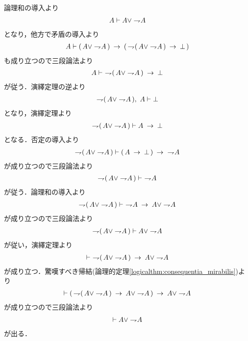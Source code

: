 	\begin{prf}
		論理和の導入より
		\begin{align}
			A \vdash A \vee \negation A
		\end{align}
		となり，他方で矛盾の導入より
		\begin{align}
			A \vdash (\, A \vee \negation A\, )
			\rarrow (\, \negation (\, A \vee \negation A\, ) \rarrow \bot\, )
		\end{align}
		も成り立つので三段論法より
		\begin{align}
			A \vdash\ \negation (\, A \vee \negation A\, ) \rarrow \bot
		\end{align}
		が従う．演繹定理の逆より
		\begin{align}
			\negation (\, A \vee \negation A\, ),\ A \vdash \bot
		\end{align}
		となり，演繹定理より
		\begin{align}
			\negation (\, A \vee \negation A\, ) \vdash A \rarrow \bot
		\end{align}
		となる．否定の導入より
		\begin{align}
			\negation (\, A \vee \negation A\, ) \vdash (\, A \rarrow \bot\, )
			\rarrow\ \negation A
		\end{align}
		が成り立つので三段論法より
		\begin{align}
			\negation (\, A \vee \negation A\, ) \vdash\ \negation A
		\end{align}
		が従う．論理和の導入より
		\begin{align}
			\negation (\, A \vee \negation A\, ) \vdash\ \negation A
			\rarrow A \vee \negation A
		\end{align}
		が成り立つので三段論法より
		\begin{align}
			\negation (\, A \vee \negation A\, ) \vdash A \vee \negation A
		\end{align}
		が従い，演繹定理より
		\begin{align}
			\vdash\ \negation (\, A \vee \negation A\, ) \rarrow A \vee \negation A
		\end{align}
		が成り立つ．驚嘆すべき帰結(論理的定理\ref{logicalthm:consequentia_mirabilis})より
		\begin{align}
			\vdash
			(\, \negation (\, A \vee \negation A\, ) \rarrow A \vee \negation A\, )
			\rarrow A \vee \negation A
		\end{align}
		が成り立つので三段論法より
		\begin{align}
			\vdash A \vee \negation A
		\end{align}
		が出る．
		\QED
	\end{prf}
	
